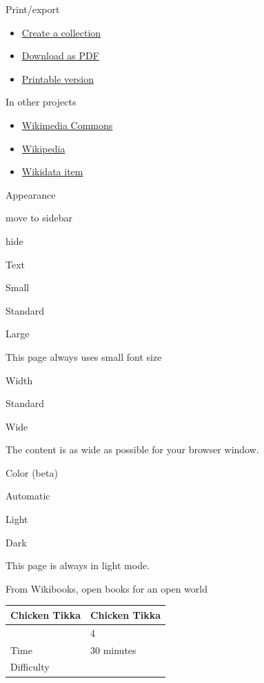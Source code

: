 \documentclass[11pt,a4paper]{article}
\begin{document}
Print/export

\begin{itemize}
\item \href{https://en.wikibooks.org/w/index.php?title=Special:Book\&bookcmd=book\_creator\&referer=Cookbook\%3AChicken+Tikka}{Create a collection}
\item \href{https://en.wikibooks.org/w/index.php?title=Special:DownloadAsPdf\&page=Cookbook\%3AChicken\_Tikka\&action=show-download-screen}{Download as PDF}
\item \href{https://en.wikibooks.org/w/index.php?title=Cookbook:Chicken\_Tikka\&printable=yes}{Printable version}
\end{itemize}

In other projects

\begin{itemize}
\item \href{https://commons.wikimedia.org/wiki/Category:Chicken\_tikka}{Wikimedia Commons}
\item \href{https://en.wikipedia.org/wiki/Chicken\_tikka}{Wikipedia}
\item \href{https://www.wikidata.org/wiki/Special:EntityPage/Q2548408}{Wikidata item}
\end{itemize}

Appearance

move to sidebar

hide

Text

Small

Standard

Large

This page always uses small font size

Width

Standard

Wide

The content is as wide as possible for your browser window.

Color (beta)

Automatic

Light

Dark

This page is always in light mode.

From Wikibooks, open books for an open world

\begin{table}[h]
\begin{tabular}{|l|l|}
\hline
Chicken Tikka & Chicken Tikka \\ \hline
\begin{figure}[h] %
Servings & 4 \\ \hline
Time & 30 minutes \\ \hline
Difficulty & \begin{figure}[h] %
\end{tabular}
\end{table}
\end{document}
